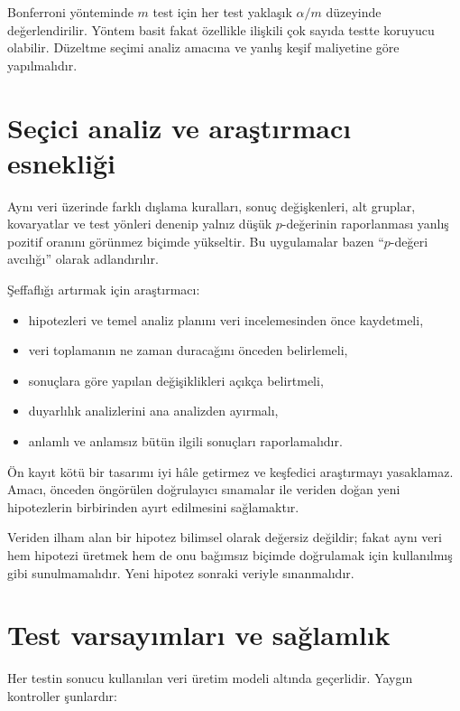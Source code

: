 Bonferroni yönteminde $m$ test için her test yaklaşık $\alpha/m$ düzeyinde
değerlendirilir. Yöntem basit fakat özellikle ilişkili çok sayıda testte
koruyucu olabilir. Düzeltme seçimi analiz amacına ve yanlış keşif maliyetine
göre yapılmalıdır.

\section{Seçici analiz ve araştırmacı esnekliği}

Aynı veri üzerinde farklı dışlama kuralları, sonuç değişkenleri, alt gruplar,
kovaryatlar ve test yönleri denenip yalnız düşük $p$-değerinin raporlanması
yanlış pozitif oranını görünmez biçimde yükseltir. Bu uygulamalar bazen
``$p$-değeri avcılığı'' olarak adlandırılır.

Şeffaflığı artırmak için araştırmacı:

\begin{itemize}
  \item hipotezleri ve temel analiz planını veri incelemesinden önce kaydetmeli,
  \item veri toplamanın ne zaman duracağını önceden belirlemeli,
  \item sonuçlara göre yapılan değişiklikleri açıkça belirtmeli,
  \item duyarlılık analizlerini ana analizden ayırmalı,
  \item anlamlı ve anlamsız bütün ilgili sonuçları raporlamalıdır.
\end{itemize}

Ön kayıt kötü bir tasarımı iyi hâle getirmez ve keşfedici araştırmayı
yasaklamaz. Amacı, önceden öngörülen doğrulayıcı sınamalar ile veriden doğan
yeni hipotezlerin birbirinden ayırt edilmesini sağlamaktır.

\begin{mistakebox}
Veriden ilham alan bir hipotez bilimsel olarak değersiz değildir; fakat aynı
veri hem hipotezi üretmek hem de onu bağımsız biçimde doğrulamak için
kullanılmış gibi sunulmamalıdır. Yeni hipotez sonraki veriyle sınanmalıdır.
\end{mistakebox}

\section{Test varsayımları ve sağlamlık}

Her testin sonucu kullanılan veri üretim modeli altında geçerlidir. Yaygın
kontroller şunlardır:

